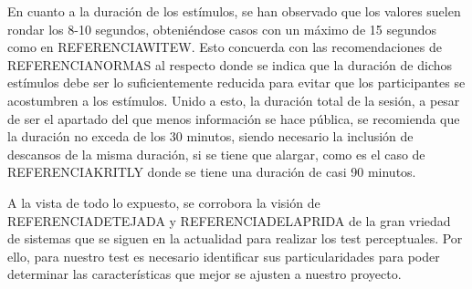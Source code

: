 \documentclass[11pt,a4paper]{book}
\begin{document}
    En cuanto a la duración de los estímulos, se han observado que los valores suelen rondar los 8-10 segundos, obteniéndose casos con un máximo de 15 segundos como en REFERENCIAWITEW. Esto concuerda con las recomendaciones de REFERENCIANORMAS al respecto donde se indica que la duración de dichos estímulos debe ser lo suficientemente reducida para evitar que los participantes se acostumbren a los estímulos. Unido a esto, la duración total de la sesión, a pesar de ser el apartado del que menos información se hace pública, se recomienda que la duración no exceda de los 30 minutos, siendo necesario la inclusión de descansos de la misma duración, si se tiene que alargar, como es el caso de REFERENCIAKRITLY donde se tiene una duración de casi 90 minutos.\newline
    
    A la vista de todo lo expuesto, se corrobora la visión de REFERENCIADETEJADA y REFERENCIADELAPRIDA de la gran vriedad de sistemas que se siguen en la actualidad para realizar los test perceptuales. Por ello, para nuestro test es necesario identificar sus particularidades para poder determinar las características que mejor se ajusten a nuestro proyecto.
    
\end{document}
